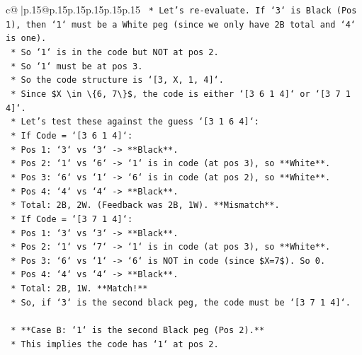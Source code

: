 \documentclass{article}
\begin{document}
{\begin{supertabular}{c@{$\;$}|p{.15\linewidth}@{}p{.15\linewidth}p{.15\linewidth}p{.15\linewidth}p{.15\linewidth}p{.15\linewidth}}
{{{\texttt{            *   Let's re{-}evaluate. If `3` is Black (Pos 1), then `1` must be a White peg (since we only have 2B total and `4` is one).} \\
\texttt{            *   So `1` is in the code but NOT at pos 2.} \\
\texttt{            *   So `1` must be at pos 3.} \\
\texttt{            *   So the code structure is `{[}3, X, 1, 4{]}`.} \\
\texttt{            *   Since \$X \textbackslash{}in \textbackslash{}\{6, 7\textbackslash{}\}\$, the code is either `{[}3 6 1 4{]}` or `{[}3 7 1 4{]}`.} \\
\texttt{            *   Let's test these against the guess `{[}3 1 6 4{]}`:} \\
\texttt{                *   If Code = `{[}3 6 1 4{]}`:} \\
\texttt{                    *   Pos 1: `3` vs `3` {-}> **Black**.} \\
\texttt{                    *   Pos 2: `1` vs `6` {-}> `1` is in code (at pos 3), so **White**.} \\
\texttt{                    *   Pos 3: `6` vs `1` {-}> `6` is in code (at pos 2), so **White**.} \\
\texttt{                    *   Pos 4: `4` vs `4` {-}> **Black**.} \\
\texttt{                    *   Total: 2B, 2W. (Feedback was 2B, 1W). **Mismatch**.} \\
\texttt{                *   If Code = `{[}3 7 1 4{]}`:} \\
\texttt{                    *   Pos 1: `3` vs `3` {-}> **Black**.} \\
\texttt{                    *   Pos 2: `1` vs `7` {-}> `1` is in code (at pos 3), so **White**.} \\
\texttt{                    *   Pos 3: `6` vs `1` {-}> `6` is NOT in code (since \$X=7\$). So 0.} \\
\texttt{                    *   Pos 4: `4` vs `4` {-}> **Black**.} \\
\texttt{                    *   Total: 2B, 1W. **Match!**} \\
\texttt{            *   So, if `3` is the second black peg, the code must be `{[}3 7 1 4{]}`.} \\
\\ 
\texttt{        *   **Case B: `1` is the second Black peg (Pos 2).**} \\
\texttt{            *   This implies the code has `1` at pos 2.} \\
}}}
\end{supertabular}}
\end{document}
